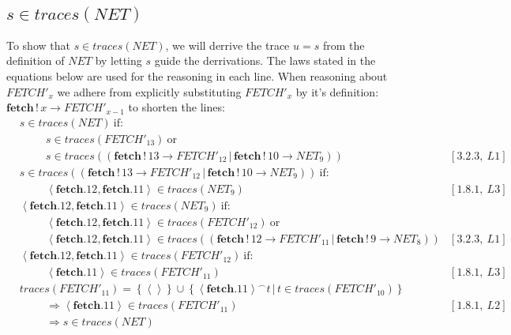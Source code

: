 \documentclass[11pt,a4paper]{article}
\def\ra{\rightarrow}
\def\ch{\,|\,}
\def\cat{^{\frown}}
\def\wr{\,!\,}
\newcommand{\chan}[1]{\textbf{#1}}
\newcommand{\ab}[1]{\left \langle #1 \right \rangle}
\newcommand{\sN}[1]{\left \lbrace #1 \right \rbrace}
\begin{document}
\subsection{$s \in traces(NET)$}
To show that $s \in traces(NET)$, we will derrive the trace $u = s$ from the
definition of $NET$ by letting $s$ guide the derrivations. The laws stated in
the equations below are used for the reasoning in each line. When reasoning
about $FETCH'_x$ we adhere from explicitly substituting $FETCH'_x$ by it's
definition: $\chan{fetch}\wr x \ra FETCH'_{x-1}$ to shorten the lines:
\begin{align*}
    &s \in traces(NET) ~\text{if:} \\
    &\hspace{1cm}s \in traces(FETCH'_{13}) ~\text{or} \\
    &\hspace{1cm}s \in traces(
    (\chan{fetch}\wr 13 \ra FETCH'_{12} \ch \chan{fetch} \wr 10 \ra NET_9)) &
[3.2.3,~L1] \\
&s \in traces((\chan{fetch}\wr 13 \ra FETCH'_{12} \ch \chan{fetch} \wr 10 \ra
NET_9))~\text{if:} \\
    &\hspace{1cm}\ab{\chan{fetch}.12, \chan{fetch}.11} \in
    traces(NET_9) & [1.8.1,~L3] \\
    &\ab{\chan{fetch}.12,\chan{fetch}.11} \in traces(NET_9) ~\text{if:} \\
    &\hspace{1cm}\ab{\chan{fetch}.12,\chan{fetch}.11} \in traces(FETCH'_{12}) ~\text{or} \\
    &\hspace{1cm}\ab{\chan{fetch}.12,\chan{fetch}.11} \in
    traces((\chan{fetch}\wr 12 \ra FETCH'_{11} \ch \chan{fetch}\wr 9 \ra NET_8))
    & [3.2.3,~L1] \\
    &\ab{\chan{fetch}.12,\chan{fetch}.11} \in traces(FETCH'_{12}) ~\text{if:}\\
    &\hspace{1cm}\ab{\chan{fetch}.11} \in traces(FETCH'_{11}) & [1.8.1,~L3] \\
    &traces(FETCH'_{11}) = \sN{\ab{ }} \cup 
    \sN{\ab{\chan{fetch}.11} \cat t \ch t \in traces(FETCH'_{10})}\\
    &\hspace{1cm} \Rightarrow \ab{\chan{fetch}.11} \in traces(FETCH'_{11})
    & [1.8.1,~L2] \\
    &\hspace{1cm} \Rightarrow s \in traces(NET)
\end{align*}
\end{document}
